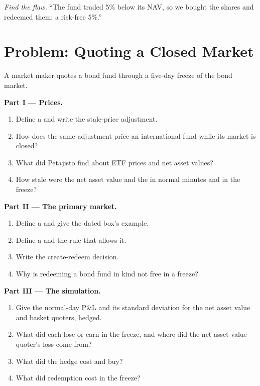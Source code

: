 \begin{exercise}[$\star\star\star$]\label{exo:hf:etf-market-making:8}
\emph{Find the flaw.} ``The fund traded 5\% below its NAV, so we bought the shares and redeemed them: a risk-free 5\%.''
\end{exercise}

\section{Problem: Quoting a Closed Market}

\begin{problem}\label{pb:hf:etf-market-making:1}
A market maker quotes a bond fund through a five-day freeze of the bond market.

\medskip\noindent\textbf{Part I --- Prices.}
\begin{enumerate}
\item Define a  and write the stale-price adjustment.
\item How does the same adjustment price an international fund while its market is closed?
\item What did Petajisto find about ETF prices and net asset values?
\item How stale were the net asset value and the  in normal minutes and in the freeze?
\end{enumerate}

\medskip\noindent\textbf{Part II --- The primary market.}
\begin{enumerate}[resume]
\item Define a  and give the dated box's example.
\item Define a  and the rule that allows it.
\item Write the create-redeem decision.
\item Why is redeeming a bond fund in kind not free in a freeze?
\end{enumerate}

\medskip\noindent\textbf{Part III --- The simulation.}
\begin{enumerate}[resume]
\item Give the normal-day P\&L and its standard deviation for the net asset value and basket quoters, hedged.
\item What did each lose or earn in the freeze, and where did the net asset value quoter's loss come from?
\item What did the hedge cost and buy?
\item What did redemption cost in the freeze?
\end{enumerate}


\end{problem}
